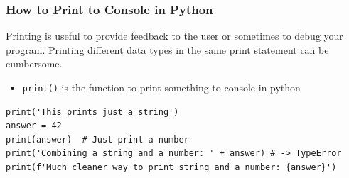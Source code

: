 \documentclass[10pt, a4paper]{beamer} %
\begin{document}
\begin{frame}[c, fragile]\frametitle{How to Print to Console in Python}
  Printing is useful to provide feedback to the user or sometimes to debug your program. Printing different data types
  in the same print statement can be cumbersome.
  \begin{itemize}
    \item \texttt{print()} is the function to print something to console in python
  \end{itemize}

\begin{lstlisting}
print('This prints just a string') 
answer = 42
print(answer)  # Just print a number
print('Combining a string and a number: ' + answer) # -> TypeError
print(f'Much cleaner way to print string and a number: {answer}')
\end{lstlisting}


\end{frame}
\end{document}
